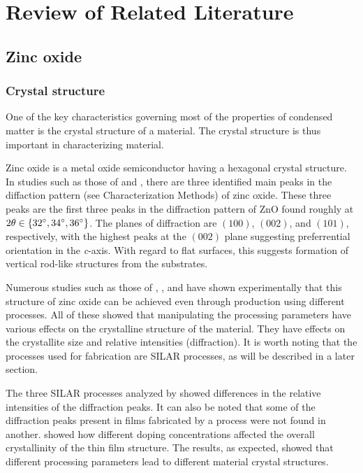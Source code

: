 \chapter{Review of Related Literature}

\section{Zinc oxide}

\subsection{Crystal structure}

One of the key characteristics governing most of the properties of condensed matter is the crystal structure of a material.
The crystal structure is thus important in characterizing material.

Zinc oxide is a metal oxide semiconductor having a hexagonal crystal structure.
In studies such as those of  and , there are three identified main peaks in the diffaction pattern (see Characterization Methods) of zinc oxide.
These three peaks are the first three peaks in the diffraction pattern of ZnO found roughly at $2\theta \in \{32^{\circ} , 34^{\circ} , 36^{\circ}\}$.
The planes of diffraction are $(100)$, $(002)$, and $(101)$, respectively, with the highest peaks at the $(002)$ plane suggesting preferrential orientation in the \textit{c}-axis.
With regard to flat surfaces, this suggests formation of vertical rod-like structures from the substrates.

Numerous studies such as those of , , and  have shown experimentally that this structure of zinc oxide can be achieved even through production using different processes.
All of these showed that manipulating the processing parameters have various effects on the crystalline structure of the material.
They have effects on the crystallite size and relative intensities (diffraction).
It is worth noting that the processes used for fabrication are SILAR processes, as will be described in a later section.

The three SILAR processes analyzed by  showed differences in the relative intensities of the diffraction peaks.
It can also be noted that some of the diffraction peaks present in films fabricated by a process were not found in another.
 showed how different doping concentrations affected the overall crystallinity of the thin film structure.
The results, as expected, showed that different processing parameters lead to different material crystal structures.

